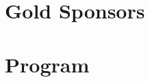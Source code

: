 \documentclass[12pt]{article}
\begin{document}
\newpage

\section*{Gold Sponsors}
\begin{minipage}{0.4\textwidth}

\end{minipage}
\hfill
\begin{minipage}{0.4\textwidth}

\end{minipage}

\vspace*{1cm}

\begin{minipage}{0.4\textwidth}

\end{minipage}
\hfill
\begin{minipage}{0.4\textwidth}

\end{minipage}

\newpage

\section*{Program}


\newpage



\newpage

\vspace*{1cm}
\end{document}
